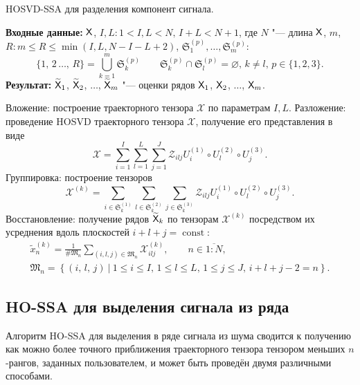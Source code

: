 \documentclass[specialist,
  substylefile=spbu_report.rtx,
subf,href,colorlinks=true, 12pt]{disser}
\theoremstyle{plain}
\theoremstyle{definition}
\theoremstyle{remark}
\newcommand{\Input}{\textbf{Входные данные: }}
\newcommand{\Output}{\textbf{Результат: }}
\begin{document}
\begin{algorithm}[!ht]
  \caption{HOSVD-SSA для разделения компонент сигнала.}
  \label{alg:hosvd-ssa-components}
  \Input $\mathsf{X}$, $I,L: 1< I,L < N,\, I + L < N + 1$, где $N$ "--- длина $\mathsf{X}$,
  $m$,\linebreak $R: m \leqslant R\leqslant \min(I, L, N-I-L+2)$,
  $\mathfrak{S}_1^{(p)}, \ldots, \mathfrak{S}_m^{(p)}$:
  \[
    \{1,\, 2\,\ldots,\, R\}=\bigcup_{k=1}^{m}\mathfrak{S}_k^{(p)} \qquad
    \mathfrak{S}_k^{(p)}\cap \mathfrak{S}_l^{(p)} =\varnothing,\, k\ne l,\, p \in \{1, 2, 3\}.
  \]
  \Output $\widetilde{\mathsf{X}}_1$, $\widetilde{\mathsf{X}}_2$, $\ldots$, $\widetilde{\mathsf{X}}_m$ "--- оценки рядов
  $\mathsf{X}_1$, $\mathsf{X}_2$, $\ldots$, $\mathsf{X}_m$.
  \begin{algorithmic}[1]
    \State \label{alg:first-step}
    Вложение: построение траекторного тензора $\mathcal{X}$ по параметрам $I, L$.
    \State \label{alg:second-step}
    Разложение: проведение HOSVD траекторного тензора $\mathcal{X}$, получение его представления в виде
    \begin{equation}
      \mathcal{X}=\sum_{i=1}^{I} \sum_{l=1}^{L} \sum_{j=1}^{J} \mathcal{Z}_{ilj} U^{(1)}_{i}
      \circ U^{(2)}_{l} \circ U^{(3)}_{j}.
      \label{eq:trajectory-hosvd}
    \end{equation}
    \State Группировка: построение тензоров
    \begin{equation*}
      \mathcal{X}^{(k)}=\sum_{i \in \mathfrak{S}_k^{(1)}} \sum_{l\in \mathfrak{S}_k^{(2)}}
      \sum_{j\in \mathfrak{S}_k^{(3)}}
      \mathcal{Z}_{ilj} U^{(1)}_{i}\circ U^{(2)}_{l} \circ U^{(3)}_{j}.
    \end{equation*}
    \State Восстановление: получение рядов $\widetilde{\mathsf{X}}_k$ по тензорам
    $\mathcal{X}^{(k)}$ посредством их усреднения вдоль
    плоскостей $i+l+j=\operatorname{const}$:
    \begin{gather*}
      \tilde{x}^{(k)}_n=\frac{1}{\#\mathfrak{M}_n}\sum_{(i,l,j)\in \mathfrak{M}_n} \mathcal{X}^{(k)}_{ilj},\qquad n\in \overline{1:N},         \\
      \mathfrak{M}_n=\left\{(i,\, l,\, j)~\Big|~1\leqslant i \leqslant I,\, 1\leqslant l \leqslant L,\, 1\leqslant j \leqslant J,\, i+l+j-2=n\right\}.
    \end{gather*}
  \end{algorithmic}
\end{algorithm}

\subsection{HO-SSA для выделения сигнала из ряда}\label{subsec:ho-ssa-signal}
Алгоритм HO-SSA для выделения в ряде сигнала из шума сводится к получению
как можно более точного приближения траекторного тензора тензором меньших $n$-рангов, заданных пользователем, и
может быть проведён двумя различными способами.
\end{document}
